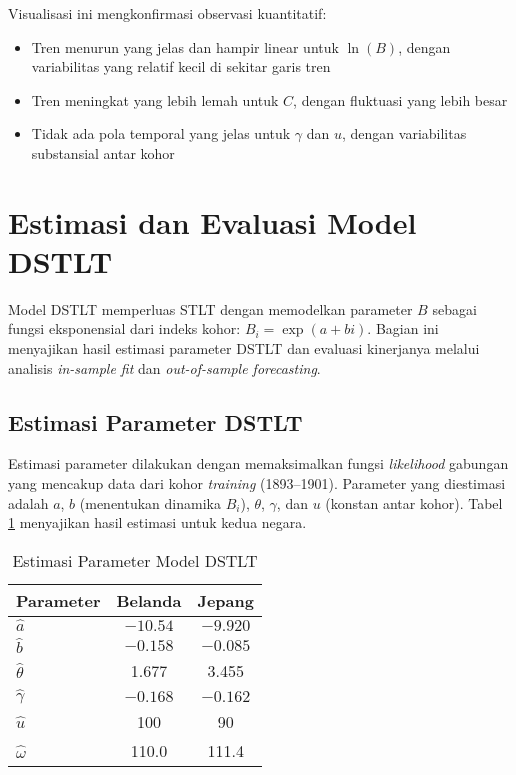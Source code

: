 Visualisasi ini mengkonfirmasi observasi kuantitatif:
\begin{itemize}
    \item Tren menurun yang jelas dan hampir linear untuk $\ln(B)$, dengan variabilitas yang relatif kecil di sekitar garis tren
    \item Tren meningkat yang lebih lemah untuk $C$, dengan fluktuasi yang lebih besar
    \item Tidak ada pola temporal yang jelas untuk $\gamma$ dan $u$, dengan variabilitas substansial antar kohor
\end{itemize}


\section{Estimasi dan Evaluasi Model DSTLT}

Model DSTLT memperluas STLT dengan memodelkan parameter $B$ sebagai fungsi eksponensial dari indeks kohor: $B_i = \exp(a + bi)$. Bagian ini menyajikan hasil estimasi parameter DSTLT dan evaluasi kinerjanya melalui analisis \textit{in-sample fit} dan \textit{out-of-sample forecasting}.

\subsection{Estimasi Parameter DSTLT}

Estimasi parameter dilakukan dengan memaksimalkan fungsi \textit{likelihood} gabungan yang mencakup data dari kohor \textit{training} (1893--1901). Parameter yang diestimasi adalah $a$, $b$ (menentukan dinamika $B_i$), $\theta$, $\gamma$, dan $u$ (konstan antar kohor). Tabel \ref{tab:dstlt_parameters} menyajikan hasil estimasi untuk kedua negara.

\begin{table}[htbp]
\centering
\caption{Estimasi Parameter Model DSTLT}
\label{tab:dstlt_parameters}
\begin{tabular}{lcc}
\hline
\textbf{Parameter} & \textbf{Belanda} & \textbf{Jepang} \\
\hline
$\hat{a}$ & $-10.54$ & $-9.920$ \\
$\hat{b}$ & $-0.158$ & $-0.085$ \\
$\hat{\theta}$ & 1.677 & 3.455 \\
$\hat{\gamma}$ & $-0.168$ & $-0.162$ \\
$\hat{u}$ & 100 & 90 \\
$\hat{\omega}$ & 110.0 & 111.4 \\
\hline
\end{tabular}
\end{table}

